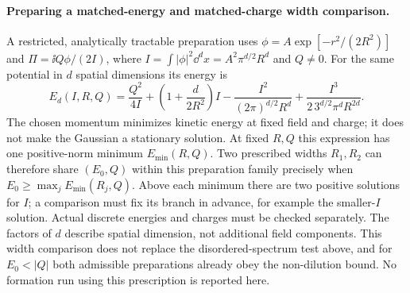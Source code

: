 \paragraph{Preparing a matched-energy and matched-charge width comparison.}
A restricted, analytically tractable preparation uses
$\phi=A\exp[-r^2/(2R^2)]$ and $\Pi=\ii Q\phi/(2I)$, where
$I=\int |\phi|^2\dd^d x=A^2\pi^{d/2}R^d$ and $Q\ne0$.
For the same potential in $d$ spatial dimensions its energy is
\[
 E_d(I,R,Q)=\frac{Q^2}{4I}
 +\left(1+\frac{d}{2R^2}\right)I
 -\frac{I^2}{(2\pi)^{d/2}R^d}
 +\frac{I^3}{2\,3^{d/2}\pi^d R^{2d}}.
\]
The chosen momentum minimizes kinetic energy at fixed field and charge;
it does not make the Gaussian a stationary solution.
At fixed $R,Q$ this expression has one positive-norm minimum
$E_{\min}(R,Q)$. Two prescribed widths $R_1,R_2$ can therefore share
$(E_0,Q)$ within this preparation family precisely when
$E_0\ge\max_j E_{\min}(R_j,Q)$.
Above each minimum there are two positive solutions for $I$; a comparison
must fix its branch in advance, for example the smaller-$I$ solution.
Actual discrete energies and charges must be checked separately.
The factors of $d$ describe spatial dimension, not additional field
components. This width comparison does not replace the disordered-spectrum
test above, and for $E_0<|Q|$ both admissible preparations already obey
the non-dilution bound. No formation run using this prescription is
reported here.
